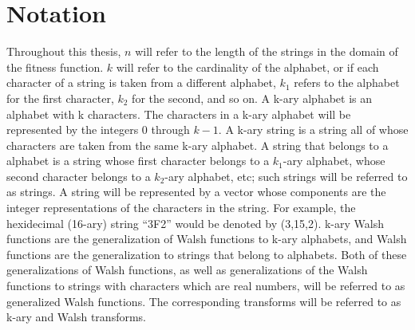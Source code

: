 \section{Notation}
Throughout this thesis, $n$ will refer to the length of the strings in
the domain of the fitness function.
$k$ will refer to the cardinality of the alphabet, or if each
character of a string is taken from a different alphabet, $k_1$ refers
to the alphabet for the first character, $k_2$ for the second, and so on.
A k-ary alphabet is an alphabet with k characters.
The characters in a k-ary alphabet will be represented by the
integers 0 through $k-1$.
A k-ary string is a string all of whose characters are taken from 
the same k-ary alphabet.
A string that belongs to a \veckary alphabet is a string whose first
character belongs to a $k_1$-ary alphabet, whose second character 
belongs to a $k_2$-ary alphabet, etc; such strings will be referred to 
as \veckary strings.
A string will be represented by a vector whose components are the
integer representations of the characters in the string.
For example, the hexidecimal (16-ary) string ``3F2'' would be denoted by (3,15,2).
k-ary Walsh functions are the generalization of Walsh functions to k-ary
alphabets, and \veckary Walsh functions are the generalization to
strings that belong to \veckary alphabets.  Both of these generalizations
of Walsh functions, as well as generalizations of the Walsh functions to
strings with characters which are real numbers, will be referred to as 
generalized Walsh functions.  The corresponding transforms will be
referred to as k-ary and \veckary Walsh transforms.

